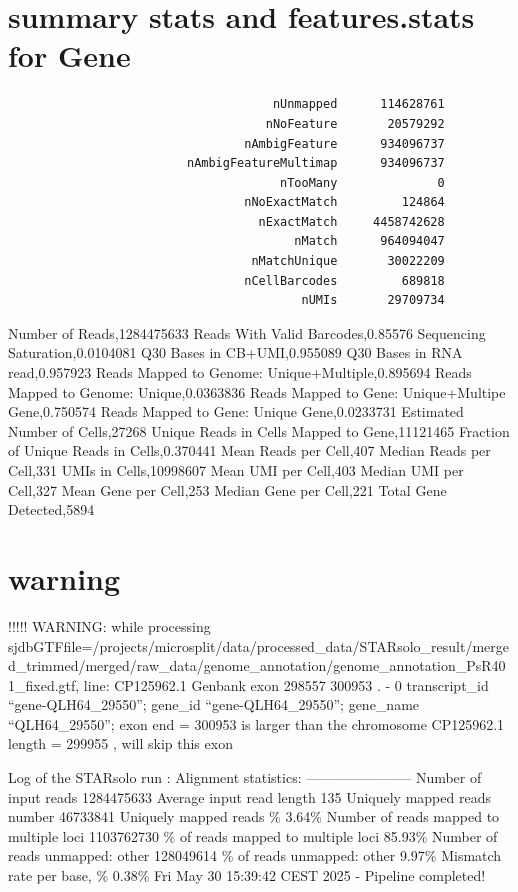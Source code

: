 \documentclass[
  11pt,
  a4paper,
]{report}
\begin{document}
\section{summary stats and features.stats for
Gene}\label{summary-stats-and-features.stats-for-gene}

\begin{verbatim}
                                     nUnmapped      114628761
                                    nNoFeature       20579292
                                 nAmbigFeature      934096737
                         nAmbigFeatureMultimap      934096737
                                      nTooMany              0
                                 nNoExactMatch         124864
                                   nExactMatch     4458742628
                                        nMatch      964094047
                                  nMatchUnique       30022209
                                 nCellBarcodes         689818
                                         nUMIs       29709734
\end{verbatim}

Number of Reads,1284475633 Reads With Valid Barcodes,0.85576 Sequencing
Saturation,0.0104081 Q30 Bases in CB+UMI,0.955089 Q30 Bases in RNA
read,0.957923 Reads Mapped to Genome: Unique+Multiple,0.895694 Reads
Mapped to Genome: Unique,0.0363836 Reads Mapped to Gene: Unique+Multipe
Gene,0.750574 Reads Mapped to Gene: Unique Gene,0.0233731 Estimated
Number of Cells,27268 Unique Reads in Cells Mapped to Gene,11121465
Fraction of Unique Reads in Cells,0.370441 Mean Reads per Cell,407
Median Reads per Cell,331 UMIs in Cells,10998607 Mean UMI per Cell,403
Median UMI per Cell,327 Mean Gene per Cell,253 Median Gene per Cell,221
Total Gene Detected,5894

\section{warning}\label{warning-2}

!!!!! WARNING: while processing
sjdbGTFfile=/projects/microsplit/data/processed\_data/STARsolo\_result/merged\_trimmed/merged/raw\_data/genome\_annotation/genome\_annotation\_PsR401\_fixed.gtf,
line: CP125962.1 Genbank exon 298557 300953 . - 0 transcript\_id
``gene-QLH64\_29550''; gene\_id ``gene-QLH64\_29550''; gene\_name
``QLH64\_29550''; exon end = 300953 is larger than the chromosome
CP125962.1 length = 299955 , will skip this exon

Log of the STARsolo run : Alignment statistics: -----------------------
Number of input reads \textbar{} 1284475633 Average input read length
\textbar{} 135 Uniquely mapped reads number \textbar{} 46733841 Uniquely
mapped reads \% \textbar{} 3.64\% Number of reads mapped to multiple
loci \textbar{} 1103762730 \% of reads mapped to multiple loci
\textbar{} 85.93\% Number of reads unmapped: other \textbar{} 128049614
\% of reads unmapped: other \textbar{} 9.97\% Mismatch rate per base, \%
\textbar{} 0.38\% Fri May 30 15:39:42 CEST 2025 - Pipeline completed!
\end{document}
